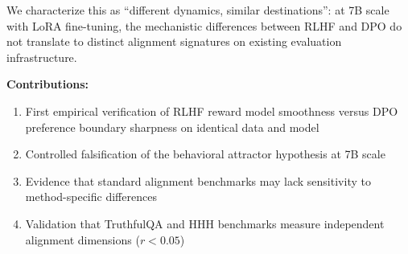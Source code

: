 We characterize this as ``different dynamics, similar destinations'': at 7B scale with LoRA fine-tuning, the mechanistic differences between RLHF and DPO do not translate to distinct alignment signatures on existing evaluation infrastructure.

\textbf{Contributions:}
\begin{enumerate}
    \item First empirical verification of RLHF reward model smoothness versus DPO preference boundary sharpness on identical data and model
    \item Controlled falsification of the behavioral attractor hypothesis at 7B scale
    \item Evidence that standard alignment benchmarks may lack sensitivity to method-specific differences
    \item Validation that TruthfulQA and HHH benchmarks measure independent alignment dimensions ($r < 0.05$)
\end{enumerate}
